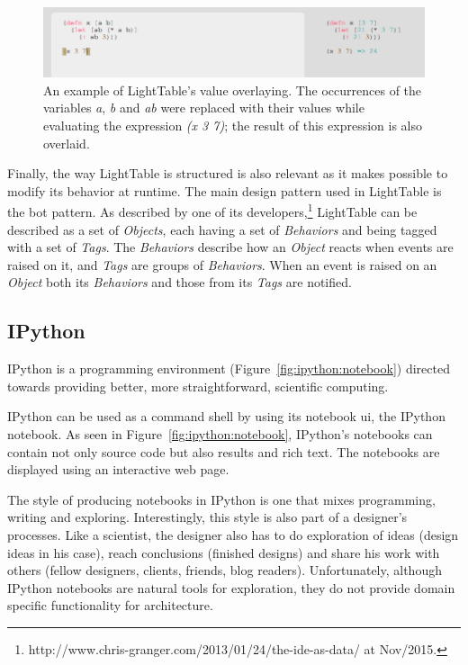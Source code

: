 \begin{figure}
	\centering
	\includegraphics[width=12cm]{./images/lt_val_overlay__inv}
	\caption{An example of LightTable's value overlaying. The occurrences of the variables \emph{a}, \emph{b} and \emph{ab} were replaced with their values while evaluating the expression \emph{(x 3 7)}; the result of this expression is also overlaid.}
	\label{fig:lt:val:overlay}
\end{figure}

Finally, the way LightTable is structured is also relevant as it makes possible to modify its behavior at runtime.
The main design pattern used in LightTable is the \gls{bot} pattern. %
As described by one of its developers,\footnote{http://www.chris-granger.com/2013/01/24/the-ide-as-data/ at Nov/2015.} LightTable can be described as a set of \emph{Objects}, each having a set of \emph{Behaviors} and being tagged with a set of \emph{Tags}.
The \emph{Behaviors} describe how an \emph{Object} reacts when events are raised on it, and \emph{Tags} are groups of \emph{Behaviors}.
When an event is raised on an \emph{Object} both its \emph{Behaviors} and those from its \emph{Tags} are notified.


\subsection{IPython}
\label{section:ipython:related}
IPython\cite{PER-GRA:2007} is a programming environment (Figure~\ref{fig:ipython:notebook}) directed towards providing better, more straightforward, scientific computing.

IPython can be used as a command shell by using its notebook \gls{ui}, the IPython notebook.
As seen in Figure~\ref{fig:ipython:notebook}, IPython's notebooks can contain not only source code but also results and rich text.
The notebooks are displayed using an interactive web page.

The style of producing notebooks in IPython is one that mixes programming, writing and exploring.
Interestingly, this style is also part of a designer's processes.
Like a scientist, the designer also has to do exploration of ideas (design ideas in his case), reach conclusions (finished designs) and share his work with others (fellow designers, clients, friends, blog readers).
Unfortunately, although IPython notebooks are natural tools for exploration, they do not provide domain specific functionality for architecture.

